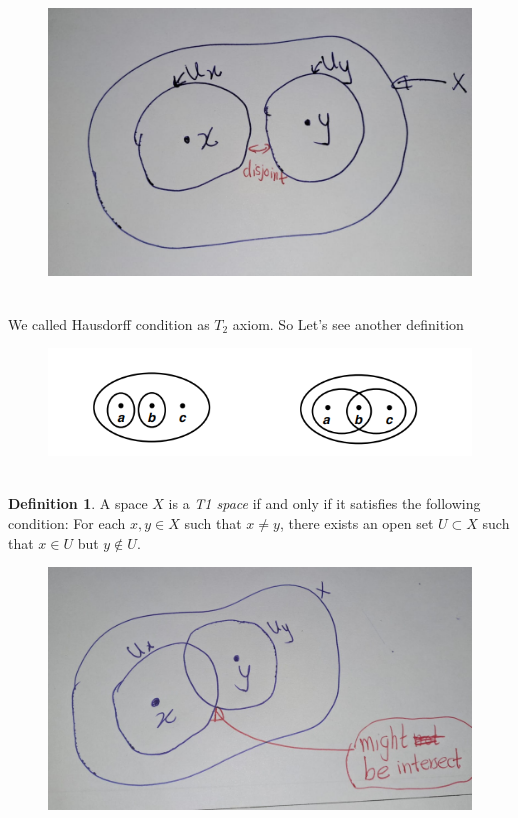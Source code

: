 \documentclass[
]{book}
\theoremstyle{definition}
\newtheorem{definition}{Definition}[chapter]
\theoremstyle{definition}
\theoremstyle{definition}
\theoremstyle{definition}
\theoremstyle{remark}
\begin{document}
\begin{figure}
\centering
\includegraphics{figures/figure 16.jpg}
\caption{\label{fig:fig16}\(~\)}
\end{figure}

We called Hausdorff condition as \(T_2\) axiom. So Let's see another definition

\begin{figure}
\centering
\includegraphics{figures/figure 02.png}
\caption{\label{fig:fig02}\(~\)}
\end{figure}

\begin{definition}
\protect\hypertarget{def:unnamed-chunk-72}{}\label{def:unnamed-chunk-72}A space \(X\) is a \emph{T1 space} if and only if it satisfies the following condition: For each \(x, y \in X\) such that \(x \neq y\), there exists an open set \(U \subset X\) such that \(x \in U\) but \(y \notin U\).
\end{definition}

\begin{figure}
\centering
\includegraphics{figures/figure 17.jpg}
\caption{\label{fig:fig17}\(~\)}
\end{figure}
\end{document}
